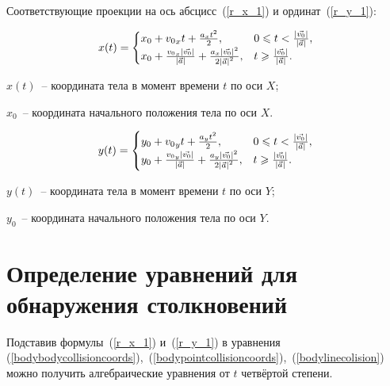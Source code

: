 Соответствующие проекции на ось абсцисс~(\ref{r_x_1}) и ординат~(\ref{r_y_1}):

\begin{equation}\label{r_x_1}
  x(t) =
  \begin{cases}
    x_0 + {v_0}_x t + \frac{a_x t^2}{2},                                                                                               & 0 \leqslant t < \frac{\left|\vec{v_0}\right|}{\left|\vec{a}\right|}, \\
    x_0 + \frac{{v_0}_x \left|\vec{v_0}\right|}{\left|\vec{a}\right|} + \frac{a_x \left|\vec{v_0}\right|^2}{2 \left|\vec{a}\right|^2}, & t \geqslant \frac{\left|\vec{v_0}\right|}{\left|\vec{a}\right|}.
  \end{cases}
\end{equation}

\begin{Underequation}
  \(x(t)\)~-- координата тела в момент времени \(t\) по оси \(X\);

  \(x_0\)~-- координата начального положения тела по оси \(X\).
\end{Underequation}

\begin{equation}\label{r_y_1}
  y(t) =
  \begin{cases}
    y_0 + {v_0}_y t + \frac{a_y t^2}{2},                                                                                               & 0 \leqslant t < \frac{\left|\vec{v_0}\right|}{\left|\vec{a}\right|}, \\
    y_0 + \frac{{v_0}_y \left|\vec{v_0}\right|}{\left|\vec{a}\right|} + \frac{a_y \left|\vec{v_0}\right|^2}{2 \left|\vec{a}\right|^2}, & t \geqslant \frac{\left|\vec{v_0}\right|}{\left|\vec{a}\right|}.
  \end{cases}
\end{equation}

\begin{Underequation}
  \(y(t)\)~-- координата тела в момент времени \(t\) по оси \(Y\);

  \(y_0\)~-- координата начального положения тела по оси \(Y\).
\end{Underequation}


\section{Определение уравнений для обнаружения столкновений}

Подставив формулы~(\ref{r_x_1}) и~(\ref{r_y_1}) в уравнения
(\ref{bodybodycollisioncoords}),~(\ref{bodypointcollisioncoords}),~(\ref{bodylinecolision})
можно получить алгебраические уравнения от \(t\) четвёртой степени.

